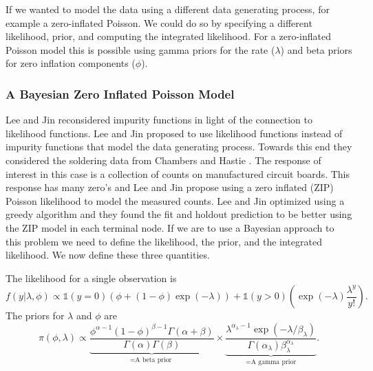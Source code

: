 If we wanted to model the data using a different data generating process, for example a zero-inflated Poisson. We could do so by specifying a different likelihood, prior, and computing the integrated likelihood. For a zero-inflated Poisson model this is possible using gamma priors for the rate ($\lambda$) and beta priors for zero inflation components ($\phi$). 
 
 \subsubsection{A Bayesian Zero Inflated Poisson Model}
 
 Lee and Jin \cite{lee2006decision} reconsidered impurity functions in light of the connection to likelihood functions. Lee and Jin \cite{lee2006decision} proposed to use likelihood functions instead of impurity functions that model the data generating process. Towards this end they considered the soldering data from Chambers and Hastie \cite{chambers1992statistical}. The response of interest in this case is a collection of counts on manufactured circuit boards. This response has many zero's and Lee and Jin \cite{lee2006decision} propose using a zero inflated (ZIP) Poisson likelihood to model the measured counts. Lee and Jin \cite{lee2006decision} optimized using a greedy algorithm and they found the fit and holdout prediction to be better using the ZIP model in each terminal node. If we are to use a Bayesian approach to this problem we need to define the likelihood, the prior, and the integrated likelihood. We now define these three quantities.
 
 The likelihood for a single observation is 
 \begin{equation}
 f(y\vert \lambda, \phi) \propto \mathds{1}(y=0)\left(\phi + (1-\phi)\exp{(-\lambda)}\right) + \mathds{1}(y>0)\left(\exp{(-\lambda)}\frac{\lambda^y}{y!}\right).
 \end{equation}
 The priors for $\lambda$ and $\phi$ are
 \begin{equation}
 \pi(\phi, \lambda)\propto \underbrace{\frac{\phi^{\alpha-1}(1-\phi)^{\beta-1}\Gamma(\alpha+\beta)}{\Gamma(\alpha)\Gamma(\beta)}}_{=\text{A beta prior }} \times \underbrace{\frac{ \lambda^{\alpha_{\lambda}-1}\exp{(-\lambda/\beta_{\lambda})} }{\Gamma(\alpha_{\lambda})\beta_{\lambda}^{\alpha_{\lambda}}}}_{=\text{A gamma prior}}.
 \end{equation}

